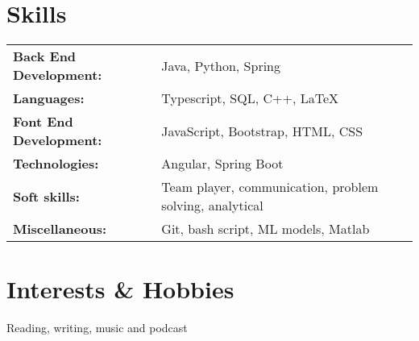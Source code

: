 \documentclass[a4paper,12pt]{article}
\begin{document}
\section{Skills}
\begin{tabularx}{\linewidth}{@{}l X@{}}
\textbf{Back End Development:} &\normalsize{Java, Python, Spring}\\
\textbf{Languages:} &  \normalsize{Typescript, SQL, C++, LaTeX}\\
\textbf{Font End Development:} &\normalsize{JavaScript, Bootstrap, HTML, CSS}\\
\textbf{Technologies:} &  \normalsize{Angular, Spring Boot}\\  
\textbf{Soft skills:} &\normalsize{Team player, communication, problem solving, analytical}\\
\textbf{Miscellaneous:} &\normalsize{Git, bash script, ML models, Matlab}\\
\end{tabularx}
\section{Interests \& Hobbies}
Reading, writing, music and podcast
\vfill
{}
\end{document}

